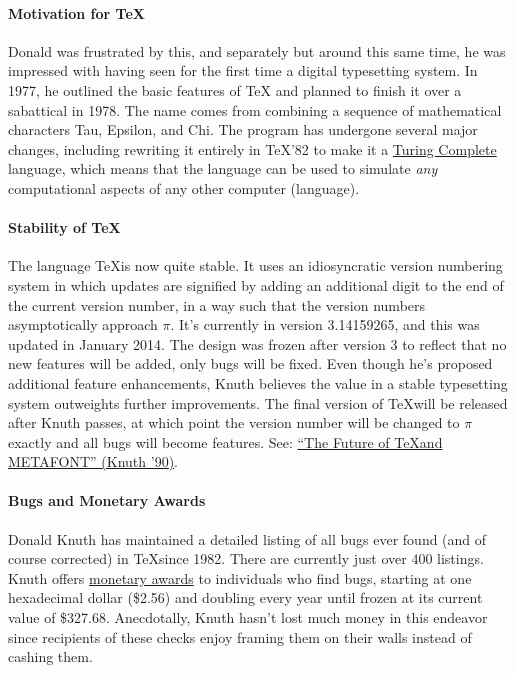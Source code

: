 \documentclass[12pt,letterpaper,twoside]{article}
\begin{document}
\paragraph{Motivation for \TeX}
Donald was frustrated by this, and
separately but around this same time, he was impressed with having
seen for the first time a digital
typesetting system. In 1977, he outlined the basic features of \TeX
and planned to finish it over a sabattical in
1978. The name comes from combining a sequence of mathematical
characters Tau, Epsilon, and Chi.
The program has undergone several major changes, including
rewriting it entirely in \TeX '82 to make it a
\href{https://en.wikipedia.org/wiki/Turing_completeness}{Turing
  Complete} language, which means that the language can be used to
simulate \emph{any} computational aspects of any other computer
(language).

\paragraph{Stability of \TeX}
The language \TeX is now quite stable. It uses an idiosyncratic
version numbering system in which updates are signified by adding an
additional digit to the end of the current version number, in a way
such that the version numbers asymptotically approach $\pi$. It's
currently in version 3.14159265, and this was updated in January
2014. The design was frozen after version 3 to reflect that no new
features will be added, only bugs will be fixed. Even though he's
proposed additional feature enhancements, Knuth believes the value in a
stable typesetting system outweights further improvements. The final
version of \TeX will be released after Knuth passes, at which point
the version number will be changed to $\pi$ exactly and all bugs will
become features. See: \href{http://www.ntg.nl/maps/05/34.pdf}{``The
  Future of \TeX and METAFONT'' (Knuth '90)}.

\paragraph{Bugs and Monetary Awards}
Donald
Knuth has maintained a detailed listing of all bugs ever found (and of course
corrected) in \TeX since 1982. There are currently just over 400
listings. Knuth offers
\href{https://en.wikipedia.org/wiki/TeX#Development}{monetary awards}
to individuals who find bugs,
starting at one hexadecimal dollar (\$2.56) and doubling every year
until frozen at its current value of \$327.68. Anecdotally, Knuth hasn't
lost much money in this endeavor since recipients of these checks
enjoy framing them on their walls instead of cashing them.
\end{document}
